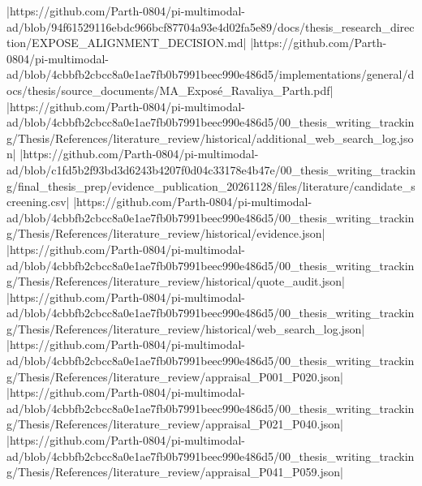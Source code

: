 |https://github.com/Parth-0804/pi-multimodal-ad/blob/94f61529116ebdc966bcf87704a93e4d02fa5e89/docs/thesis_research_direction/EXPOSE_ALIGNMENT_DECISION.md|
|https://github.com/Parth-0804/pi-multimodal-ad/blob/4cbbfb2cbcc8a0e1ae7fb0b7991beec990e486d5/implementations/general/docs/thesis/source_documents/MA_Exposé_Ravaliya_Parth.pdf|
|https://github.com/Parth-0804/pi-multimodal-ad/blob/4cbbfb2cbcc8a0e1ae7fb0b7991beec990e486d5/00_thesis_writing_tracking/Thesis/References/literature_review/historical/additional_web_search_log.json|
|https://github.com/Parth-0804/pi-multimodal-ad/blob/c1fd5b2f93bd3d6243b4207f0d04c33178e4b47e/00_thesis_writing_tracking/final_thesis_prep/evidence_publication_20261128/files/literature/candidate_screening.csv|
|https://github.com/Parth-0804/pi-multimodal-ad/blob/4cbbfb2cbcc8a0e1ae7fb0b7991beec990e486d5/00_thesis_writing_tracking/Thesis/References/literature_review/historical/evidence.json|
|https://github.com/Parth-0804/pi-multimodal-ad/blob/4cbbfb2cbcc8a0e1ae7fb0b7991beec990e486d5/00_thesis_writing_tracking/Thesis/References/literature_review/historical/quote_audit.json|
|https://github.com/Parth-0804/pi-multimodal-ad/blob/4cbbfb2cbcc8a0e1ae7fb0b7991beec990e486d5/00_thesis_writing_tracking/Thesis/References/literature_review/historical/web_search_log.json|
|https://github.com/Parth-0804/pi-multimodal-ad/blob/4cbbfb2cbcc8a0e1ae7fb0b7991beec990e486d5/00_thesis_writing_tracking/Thesis/References/literature_review/appraisal_P001_P020.json|
|https://github.com/Parth-0804/pi-multimodal-ad/blob/4cbbfb2cbcc8a0e1ae7fb0b7991beec990e486d5/00_thesis_writing_tracking/Thesis/References/literature_review/appraisal_P021_P040.json|
|https://github.com/Parth-0804/pi-multimodal-ad/blob/4cbbfb2cbcc8a0e1ae7fb0b7991beec990e486d5/00_thesis_writing_tracking/Thesis/References/literature_review/appraisal_P041_P059.json|
